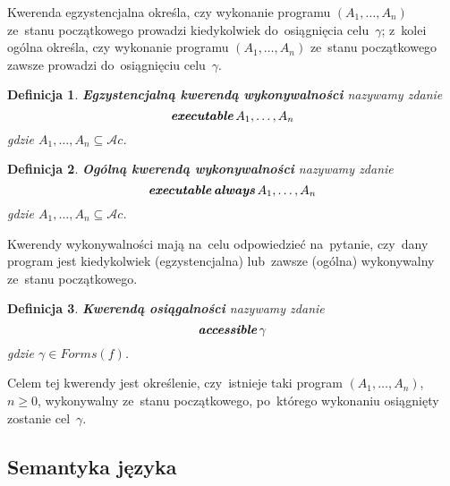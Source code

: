 \documentclass[11pt,a4paper]{article}
\newtheorem{defn}{Definicja}
\DeclareMathOperator{\Always}{\textbf{\textit{always}}}
\DeclareMathOperator{\Executable}{\textbf{\textit{executable}}}
\DeclareMathOperator{\Accessible}{\textbf{\textit{accessible}}}
\begin{document}
    Kwerenda egzystencjalna określa, czy wykonanie programu $(A_1, \dots, A_n)$ ze~stanu początkowego prowadzi kiedykolwiek do~osiągnięcia celu~$\gamma$; z~kolei ogólna określa, czy wykonanie programu $(A_1, \dots, A_n)$ ze~stanu początkowego zawsze prowadzi do~osiągnięciu celu~$\gamma$.

    \begin{defn}
        \textbf{Egzystencjalną kwerendą wykonywalności} nazywamy zdanie
        $$ \Executable A_1, \dots, A_n $$
        gdzie $A_1, \dots, A_n \subseteq \mathcal{A}c$.
    \end{defn}

    \begin{defn}
        \textbf{Ogólną kwerendą wykonywalności} nazywamy zdanie
        $$ \Executable \Always A_1, \dots, A_n $$
        gdzie $A_1, \dots, A_n \subseteq \mathcal{A}c$.
    \end{defn}

    Kwerendy wykonywalności mają na~celu odpowiedzieć na~pytanie, czy~dany program jest kiedykolwiek (egzystencjalna) lub~zawsze (ogólna) wykonywalny ze~stanu początkowego.

    \begin{defn}
        \textbf{Kwerendą osiągalności} nazywamy zdanie
        $$ \Accessible \gamma $$
        gdzie $\gamma \in Forms(f)$.
    \end{defn}
    
    Celem tej kwerendy jest określenie, czy~istnieje taki program $(A_1, \dots, A_n)$, $n \geq 0$, wykonywalny ze~stanu początkowego, po~którego wykonaniu osiągnięty zostanie cel~$\gamma$.

\subsection{Semantyka języka}
\end{document}
